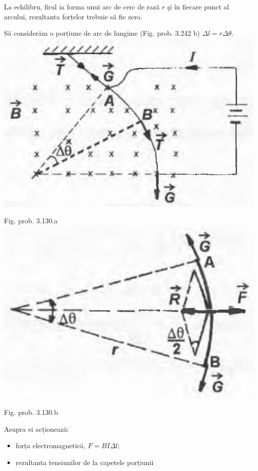 \documentclass[10pt]{article}
\begin{document}
La echilibru, firul ia forma unui arc de cerc de rază $r$ şi în fiecare punct al arcului, rezultanta forțelor trebuie să fie zero.

Să considerăm o porțiune de arc de lungime (Fig. prob. 3.242 b) $\Delta l=r \Delta \theta$.\\
\includegraphics[max width=\textwidth, center]{2025_07_01_5b3ff9fa0d508c8e9f17g-366}

Fig. prob. 3.130.a\\
\includegraphics[max width=\textwidth, center]{2025_07_01_5b3ff9fa0d508c8e9f17g-366(2)}

Fig. prob. 3.130.b

Asupra ei acționează:

\begin{itemize}
  \item forța electromagnetică, $F=B I \Delta l$;
  \item rezultanta tensiunilor de la capetele porțiunii
\end{itemize}
\end{document}
